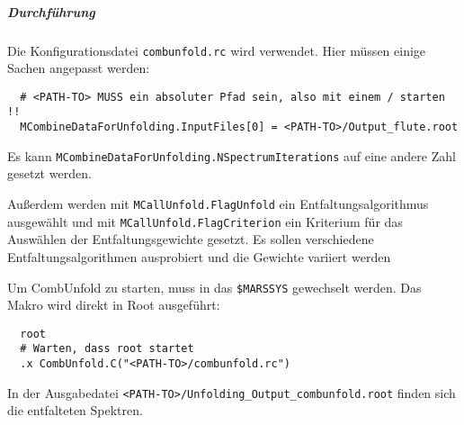 \subparagraph{Durchführung}%

Die Konfigurationsdatei \texttt{combunfold.rc} wird verwendet.
Hier müssen einige Sachen angepasst werden:
\begin{lstlisting}
  # <PATH-TO> MUSS ein absoluter Pfad sein, also mit einem / starten !!
  MCombineDataForUnfolding.InputFiles[0] = <PATH-TO>/Output_flute.root
\end{lstlisting}
Es kann
\texttt{MCombineDataForUnfolding.NSpectrumIterations}
auf eine andere Zahl gesetzt werden.

Außerdem werden mit
\texttt{MCallUnfold.FlagUnfold}
ein Entfaltungsalgorithmus ausgewählt und mit
\texttt{MCallUnfold.FlagCriterion}
ein Kriterium für das Auswählen der Entfaltungsgewichte gesetzt.
Es sollen verschiedene Entfaltungsalgorithmen ausprobiert 
und die Gewichte variiert werden 

Um CombUnfold zu starten, muss in das
\texttt{\$MARSSYS}
gewechselt werden.
Das Makro wird direkt in Root ausgeführt:
\begin{lstlisting}
  root
  # Warten, dass root startet
  .x CombUnfold.C("<PATH-TO>/combunfold.rc")
\end{lstlisting}

In der Ausgabedatei
\texttt{<PATH-TO>/Unfolding\_Output\_combunfold.root}
finden sich die entfalteten Spektren.

